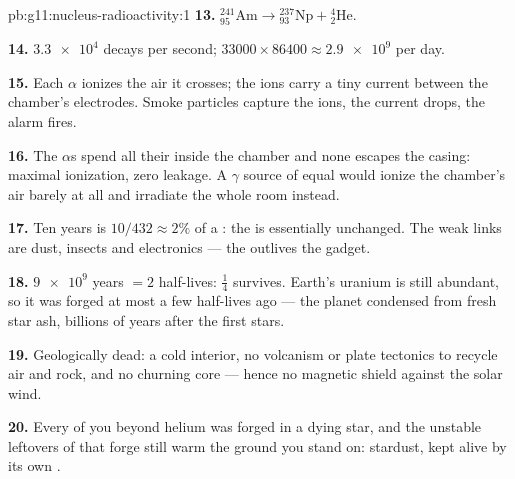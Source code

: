\begin{solution}{pb:g11:nucleus-radioactivity:1}
\textbf{13.} ${}^{241}_{95}\mathrm{Am} \to {}^{237}_{93}\mathrm{Np} +
{}^{4}_{2}\mathrm{He}$.

\textbf{14.} $\num{3.3e4}$ decays per second;
$\num{33000} \times 86400 \approx \num{2.9e9}$ per day.

\textbf{15.} Each $\alpha$ ionizes the air it crosses; the ions carry a
tiny current between the chamber's electrodes. Smoke particles capture the
ions, the current drops, the alarm fires.

\textbf{16.} The $\alpha$s spend all their  inside the chamber and
none escapes the casing: maximal ionization, zero leakage. A $\gamma$
source of equal  would ionize the chamber's air barely at all and
irradiate the whole room instead.

\textbf{17.} Ten years is $10/432 \approx 2\%$ of a : the
 is essentially unchanged. The weak links are dust, insects and
electronics --- the  outlives the gadget.

\textbf{18.} $\num{9e9}$ years $= 2$ half-lives: $\frac14$ survives.
Earth's uranium is still abundant, so it was forged at most a few
half-lives ago --- the planet condensed from fresh star ash, billions of
years after the first stars.

\textbf{19.} Geologically dead: a cold interior, no volcanism or plate
tectonics to recycle air and rock, and no churning core --- hence no
magnetic shield against the solar wind.

\textbf{20.} Every  of you beyond helium was forged in a dying star,
and the unstable leftovers of that forge still warm the ground you stand
on: stardust, kept alive by its own .
\end{solution}
